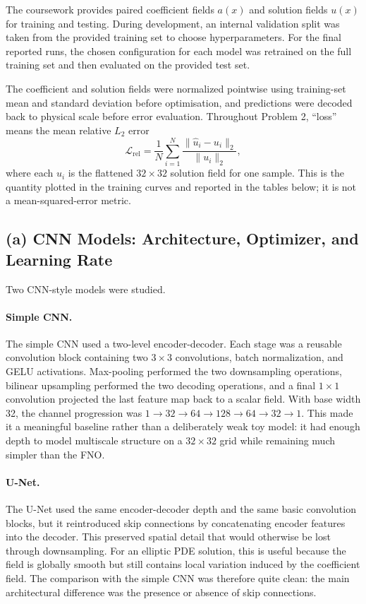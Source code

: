 \documentclass[11pt]{article}
\begin{document}
The coursework provides paired coefficient fields \(a(x)\) and solution fields \(u(x)\) for training and testing. During development, an internal validation split was taken from the provided training set to choose hyperparameters. For the final reported runs, the chosen configuration for each model was retrained on the full training set and then evaluated on the provided test set.

The coefficient and solution fields were normalized pointwise using training-set mean and standard deviation before optimisation, and predictions were decoded back to physical scale before error evaluation. Throughout Problem 2, ``loss'' means the mean relative \(L_2\) error
\[
\mathcal{L}_{\mathrm{rel}}
=
\frac{1}{N}\sum_{i=1}^{N}
\frac{\|\hat{u}_i-u_i\|_2}{\|u_i\|_2},
\]
where each \(u_i\) is the flattened \(32\times32\) solution field for one sample. This is the quantity plotted in the training curves and reported in the tables below; it is not a mean-squared-error metric.

\subsection*{(a) CNN Models: Architecture, Optimizer, and Learning Rate}

Two CNN-style models were studied.

\paragraph{Simple CNN.}
The simple CNN used a two-level encoder-decoder. Each stage was a reusable convolution block containing two \(3\times3\) convolutions, batch normalization, and GELU activations. Max-pooling performed the two downsampling operations, bilinear upsampling performed the two decoding operations, and a final \(1\times1\) convolution projected the last feature map back to a scalar field. With base width 32, the channel progression was \(1 \rightarrow 32 \rightarrow 64 \rightarrow 128 \rightarrow 64 \rightarrow 32 \rightarrow 1\). This made it a meaningful baseline rather than a deliberately weak toy model: it had enough depth to model multiscale structure on a \(32\times32\) grid while remaining much simpler than the FNO.

\paragraph{U-Net.}
The U-Net used the same encoder-decoder depth and the same basic convolution blocks, but it reintroduced skip connections by concatenating encoder features into the decoder. This preserved spatial detail that would otherwise be lost through downsampling. For an elliptic PDE solution, this is useful because the field is globally smooth but still contains local variation induced by the coefficient field. The comparison with the simple CNN was therefore quite clean: the main architectural difference was the presence or absence of skip connections.
\end{document}

